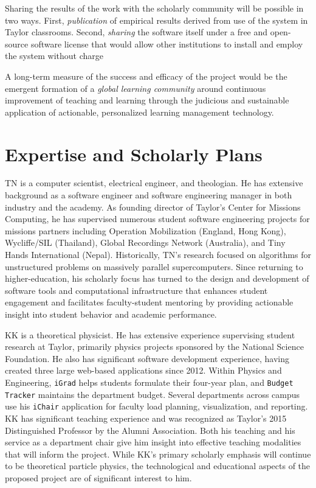 \documentclass{article}
\begin{document}
Sharing the results of the work with the scholarly community
will be possible in two ways.
First, \emph{publication} of empirical results
derived from use of the system in Taylor classrooms.
Second, \emph{sharing} the software itself
under a free and open-source software license that would
allow other institutions to install and employ the
system without charge

A long-term measure of the success and efficacy of the project
would be the emergent formation of
a \emph{global learning community} around
continuous improvement of
teaching and learning
through the judicious and sustainable application
of actionable, personalized learning management technology.

\section{Expertise and Scholarly Plans}
\label{sec:expertise-plans}


TN is a computer scientist, electrical engineer, and theologian.
He has extensive background as a software engineer
and software engineering manager
in both industry and the academy.
As founding director of Taylor's Center for Missions Computing,
he has supervised numerous student software engineering projects
for missions partners including
Operation Mobilization (England, Hong Kong),
Wycliffe/SIL (Thailand),
Global Recordings Network (Australia),
and Tiny Hands International (Nepal).
Historically, TN's research focused on
algorithms for unstructured problems on
massively parallel supercomputers.
Since returning to higher-education,
his scholarly focus has turned
to the design and development
of software tools and computational infrastructure
that enhances student engagement
and facilitates faculty-student mentoring
by providing actionable insight
into student behavior and academic performance.

\newcommand{\igrad}{\texttt{iGrad}}
\newcommand{\ichair}{\texttt{iChair}}
\newcommand{\btracker}{\texttt{Budget Tracker}}

KK is a theoretical physicist.
He has extensive experience
supervising student research at Taylor,
primarily physics projects sponsored by the National Science Foundation.
He also has significant software development experience,
having created three large web-based applications since 2012.
Within Physics and Engineering,
\igrad{} helps students formulate their four-year plan,
and \btracker{} maintains the department budget.
Several departments across campus use his
\ichair{} application
for faculty load planning, visualization, and reporting.
KK has significant teaching experience
and was recognized as
Taylor's 2015 Distinguished Professor
by the Alumni Association.
Both his teaching and his service as a department chair
give him insight into effective teaching modalities
that will inform the project.
While KK's primary scholarly emphasis will continue to be
theoretical particle physics,
the technological and educational aspects of the proposed project
are of significant interest to him.
\end{document}
